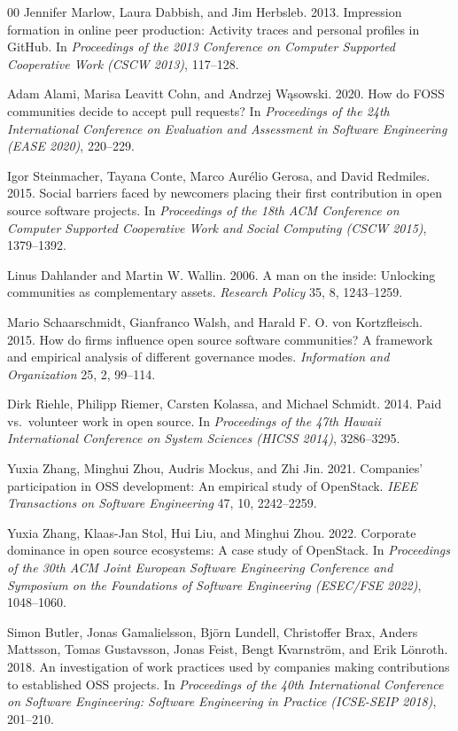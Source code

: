 \documentclass[sigconf,screen]{acmart}
\begin{document}
\begin{thebibliography}{00}
Jennifer Marlow, Laura Dabbish, and Jim Herbsleb. 2013. Impression formation in online peer production: Activity traces and personal profiles in GitHub. In \emph{Proceedings of the 2013 Conference on Computer Supported Cooperative Work (CSCW 2013)}, 117--128.

Adam Alami, Marisa Leavitt Cohn, and Andrzej W\k{a}sowski. 2020. How do FOSS communities decide to accept pull requests? In \emph{Proceedings of the 24th International Conference on Evaluation and Assessment in Software Engineering (EASE 2020)}, 220--229.

Igor Steinmacher, Tayana Conte, Marco Aur\'elio Gerosa, and David Redmiles. 2015. Social barriers faced by newcomers placing their first contribution in open source software projects. In \emph{Proceedings of the 18th ACM Conference on Computer Supported Cooperative Work and Social Computing (CSCW 2015)}, 1379--1392.

Linus Dahlander and Martin W. Wallin. 2006. A man on the inside: Unlocking communities as complementary assets. \emph{Research Policy} 35, 8, 1243--1259.

Mario Schaarschmidt, Gianfranco Walsh, and Harald F. O. von Kortzfleisch. 2015. How do firms influence open source software communities? A framework and empirical analysis of different governance modes. \emph{Information and Organization} 25, 2, 99--114.

Dirk Riehle, Philipp Riemer, Carsten Kolassa, and Michael Schmidt. 2014. Paid vs.\ volunteer work in open source. In \emph{Proceedings of the 47th Hawaii International Conference on System Sciences (HICSS 2014)}, 3286--3295.

Yuxia Zhang, Minghui Zhou, Audris Mockus, and Zhi Jin. 2021. Companies' participation in OSS development: An empirical study of OpenStack. \emph{IEEE Transactions on Software Engineering} 47, 10, 2242--2259.

Yuxia Zhang, Klaas-Jan Stol, Hui Liu, and Minghui Zhou. 2022. Corporate dominance in open source ecosystems: A case study of OpenStack. In \emph{Proceedings of the 30th ACM Joint European Software Engineering Conference and Symposium on the Foundations of Software Engineering (ESEC/FSE 2022)}, 1048--1060.

Simon Butler, Jonas Gamalielsson, Bj\"orn Lundell, Christoffer Brax, Anders Mattsson, Tomas Gustavsson, Jonas Feist, Bengt Kvarnstr\"om, and Erik L\"onroth. 2018. An investigation of work practices used by companies making contributions to established OSS projects. In \emph{Proceedings of the 40th International Conference on Software Engineering: Software Engineering in Practice (ICSE-SEIP 2018)}, 201--210.


\end{thebibliography}
\end{document}
